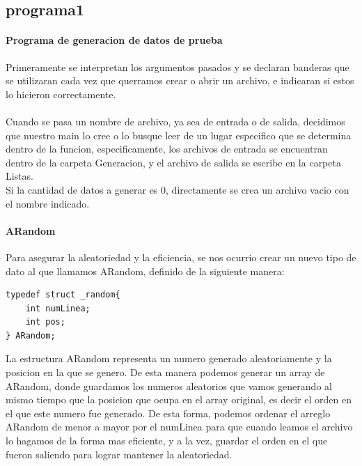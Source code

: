\documentclass{article}
\begin{document}
	 \subsection{programa1}
	 \paragraph{Programa de generacion de datos de prueba}
	 Primeramente se interpretan los argumentos pasados y se declaran banderas que se utilizaran cada vez que querramos crear o abrir un archivo, e indicaran si estos lo hicieron correctamente.
	 \paragraph{} 
	 Cuando se pasa un nombre de archivo, ya sea de entrada o de salida, decidimos que nuestro main lo cree o lo busque leer de un lugar especifico que se determina dentro de la funcion, especificamente, los archivos de entrada se encuentran dentro de la carpeta Generacion, y el archivo de salida se escribe en la carpeta Listas.
	 \\
	 Si la cantidad de datos a generar es 0, directamente se crea un archivo vacio con el nombre indicado.
	 \\
	 \paragraph{ARandom} Para asegurar la aleatoriedad y la eficiencia, se nos ocurrio crear un nuevo tipo de dato al que llamamos ARandom, definido de la siguiente manera:
	 \begin{lstlisting}[style=CStyle]
typedef struct _random{
	int numLinea;
	int pos;
} ARandom;
	 \end{lstlisting}
	 La estructura ARandom representa un numero generado aleatoriamente y la posicion en la que se genero. De esta manera podemos generar un array de ARandom, donde guardamos los numeros aleatorios que vamos generando al mismo tiempo que la posicion que ocupa en el array original, es decir el orden en el que este numero fue generado. De esta forma, podemos ordenar el arreglo ARandom de menor a mayor por el numLinea para que cuando leamos el archivo lo hagamos de la forma mas eficiente, y a la vez, guardar el orden en el que fueron saliendo para lograr mantener la aleatoriedad.
	 
\end{document}
